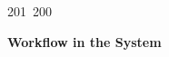 201~200~\documentclass{article}
\begin{document}
	                                                                                                                                                                                                                                                                                                	                                                                                                                                        	    	                                                                                                	                                                                                                                                                                                                                                                                                                                                	                                                                        	                                                                        	                                                                                                                                        	                                                                                                                                                                                                                        	                                                                                                                            	                                                                	                                                                \textbf{Workflow in the System}
\end{document}
